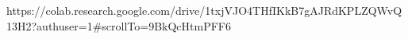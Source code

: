 https://colab.research.google.com/drive/1txjVJO4THfIKkB7gAJRdKPLZQWvQ13H2?authuser=1#scrollTo=9BkQcHtmPFF6
